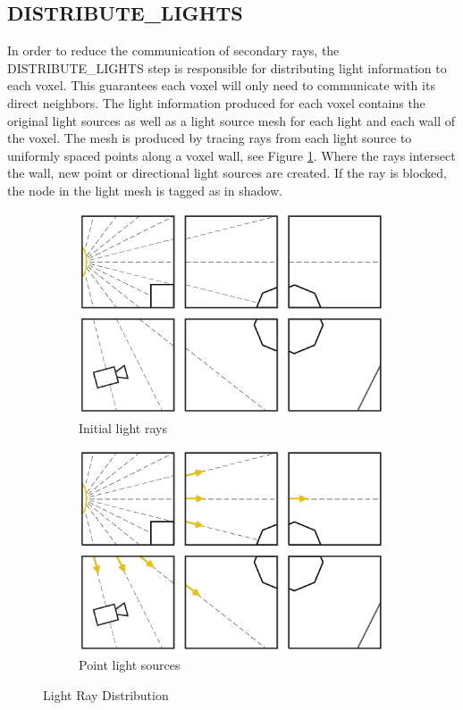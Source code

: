 \subsection{DISTRIBUTE\_LIGHTS}

In order to reduce the communication of secondary rays,
the DISTRIBUTE\_LIGHTS step is responsible for distributing light
information to each voxel. This guarantees each voxel will only need
to communicate with its direct neighbors. The light information
produced for each voxel contains the original light sources as well as
a light source mesh for each light and each wall of the voxel. The
mesh is produced by tracing rays from each light source to uniformly
spaced points along a voxel wall, see Figure \ref{fig:light}. Where
the rays intersect the wall, new point or directional light sources
are created. If the ray is blocked, the node in the light mesh is
tagged as in shadow.

\begin{figure}[!htb]
\centering
\begin{subfigure}{0.49\textwidth}
 \centering
  \includegraphics[width=.98\columnwidth]{drawings/Lights1.pdf}
  \caption{Initial light rays}
\end{subfigure}
\begin{subfigure}{0.49\textwidth}
 \centering
  \includegraphics[width=.98\columnwidth]{drawings/Lights2.pdf}
  \caption{Point light sources}
\end{subfigure}
\caption{Light Ray Distribution}
\label{fig:light}
\end{figure}

